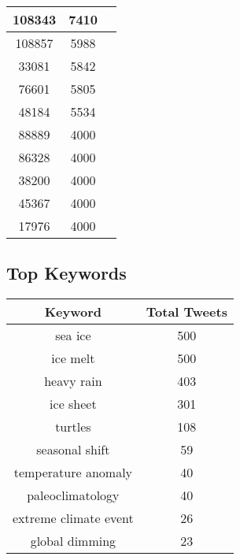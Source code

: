 \documentclass{article}\usepackage[T1]{fontenc}
\begin{document}
\begin{tabular}{|c|c|c|}
 \hline
108343 & 7410\\ 
 \hline
108857 & 5988\\ 
 \hline
33081 & 5842\\ 
 \hline
76601 & 5805\\ 
 \hline
48184 & 5534\\ 
 \hline
88889 & 4000\\ 
 \hline
86328 & 4000\\ 
 \hline
38200 & 4000\\ 
 \hline
45367 & 4000\\ 
 \hline
17976 & 4000\\ 
 \hline
\end{tabular}\subsection*{Top Keywords}\begin{tabular}{|c|c|}         \hline         Keyword & Total Tweets \\ 
 \hline
sea ice & 500\\ 
 \hline
ice melt & 500\\ 
 \hline
heavy rain & 403\\ 
 \hline
ice sheet & 301\\ 
 \hline
turtles & 108\\ 
 \hline
seasonal shift & 59\\ 
 \hline
temperature anomaly & 40\\ 
 \hline
paleoclimatology & 40\\ 
 \hline
extreme climate event & 26\\ 
 \hline
global dimming & 23\\ 
 \hline
\end{tabular}
\end{document}
